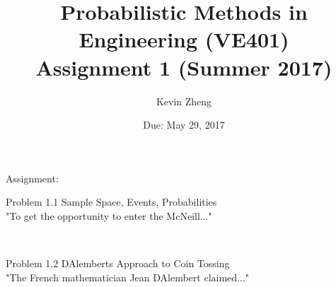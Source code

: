\documentclass[11pt]{exam}
\begin{document}
\title{\vspace{-8ex} Probabilistic Methods in Engineering (VE401) \\
        Assignment 1 (Summer 2017)
        \vspace{-2ex}}
\date{Due: May 29, 2017\vspace{-2ex} }
\author{ Kevin Zheng\vspace{-2ex} }

\maketitle

\begin{questions}

{\bf \item[] Assignment:}
\question[7] Problem 1.1 Sample Space, Events, Probabilities \\
"To get the opportunity to enter the McNeill..."
\begin{solution}\\



\end{solution}
\question[4] Problem 1.2 DAlemberts Approach to Coin Tossing \\
"The French mathematician Jean DAlembert claimed..."
\begin{solution}\\



\end{solution}
\end{questions}
\end{document}
